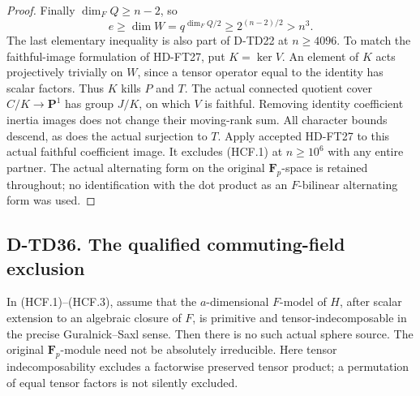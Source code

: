 \begin{proof}
Finally $\dim_F Q\ge n-2$, so
\[
 e\ge\dim W=q^{\dim_F Q/2}
         \ge2^{(n-2)/2}>n^3.
 \tag{HCF.13}
\]
The last elementary inequality is also part of D-TD22 at
$n\ge4096$.  To match the faithful-image formulation of HD-FT27,
put $K=\ker V$.  An element of $K$ acts projectively trivially
on $W$, since a tensor operator equal to the identity has scalar
factors.  Thus $K$ kills $P$ and $T$.  The actual connected
quotient cover $C/K\to\mathbf P^1$ has group $J/K$, on which
$V$ is faithful.  Removing identity coefficient inertia images
does not change their moving-rank sum.  All character bounds
descend, as does the actual surjection to $T$.
Apply accepted HD-FT27 to this actual faithful coefficient image.
It excludes (HCF.1) at $n\ge10^6$ with any entire partner.
The actual alternating form on the original $\mathbf F_p$-space
is retained throughout; no identification with the dot product
as an $F$-bilinear alternating form was used.
\end{proof}

\subsection*{D-TD36. The qualified commuting-field exclusion}

\begin{theorem}[D-TD36]
In (HCF.1)--(HCF.3), assume that the $a$-dimensional $F$-model
of $H$, after scalar extension to an algebraic closure of $F$,
is primitive and tensor-indecomposable in the precise
Guralnick--Saxl sense.  Then there is no such actual sphere source.
The original $\mathbf F_p$-module need not be absolutely irreducible.
Here tensor indecomposability excludes a factorwise preserved tensor
product; a permutation of equal tensor factors is not silently excluded.
\end{theorem}

